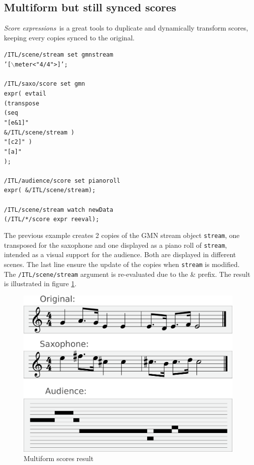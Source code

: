 \documentclass{article}
\newcommand{\OSC}[1]{\texttt{#1}}
\newcommand{\SExpr}{\emph{Score expressions}}
\newcommand{\tab}{\hspace*{4mm}}
\newcommand{\sample}	[1]			{\vspace{-0.2em}\begin{center}\colorbox{mygrey}{\begin{minipage}[t]{0.95\columnwidth} {\small \texttt{#1}}\end{minipage}}\end{center}}
\begin{document}
\subsection{Multiform but still synced scores}\label{sample2}
\SExpr\ is a great tools to duplicate and dynamically transform scores, keeping every copies synced to the original.

\sample{/ITL/scene/stream set gmnstream \\
\tab '[$\backslash$meter<"4/4">]';\\
\\
/ITL/saxo/score set gmn \\
\tab expr( evtail\\
\tab \tab (transpose\\
\tab \tab \tab (seq\\
\tab \tab \tab \tab "[e\&1]"\\
\tab \tab \tab \tab \&/ITL/scene/stream )\\
\tab \tab \tab "[c2]" )\\
\tab \tab "[a]"\\
\tab );\\
\\
/ITL/audience/score set pianoroll \\
\tab expr( \&/ITL/scene/stream);\\
\\
/ITL/scene/stream watch newData\\
\tab(/ITL/*/score expr reeval);
}

The previous example creates 2 copies of the GMN stream object \OSC{stream}, one transposed for the saxophone and one displayed as a piano roll of \OSC{stream}, intended as a visual support for the audience. Both are displayed in different scenes.
The last line ensure the update of the copies when \OSC{stream} is modified. The \OSC{/ITL/scene/stream} argument is re-evaluated due to the \& prefix. The result is illustrated in figure \ref{fig:mutliscoreFig}.

\begin{figure}[th]
\centering
\includegraphics[width=0.8\columnwidth]{imgs/example1}
\caption{Multiform scores result
\label{fig:mutliscoreFig}}
\end{figure}
\end{document}
